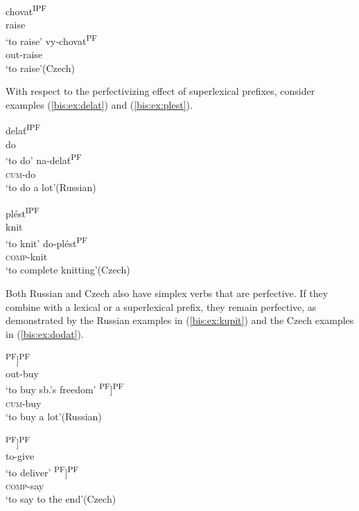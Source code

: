 \documentclass[output=paper]{langscibook}
\begin{document}
\ex\label{bis:ex:chovat}
\ea\label{bis:ex:chovatA} \gll chovat\textsuperscript{IPF} \\ 
raise \\
\glt ‘to raise’
\ex\label{bis:ex:vychovatB} \gll vy-chovat\textsuperscript{PF} \\ 
out-raise \\
\glt ‘to raise’\hfill (Czech)
\z\z

\noindent With respect to the perfectivizing effect of superlexical prefixes, consider examples (\ref{bis:ex:delat}) and (\ref{bis:ex:plest}).

\ea\label{bis:ex:delat}
\ea\label{bis:ex:delatA} \gll delať\textsuperscript{IPF} \\ 
do \\
\glt ‘to do’
\ex\label{bis:ex:nadelatB} \gll na-delať\textsuperscript{PF} \\  
\textsc{cum}-do \\
\glt ‘to do a lot’\hfill (Russian)
\z

\ex\label{bis:ex:plest}
\ea\label{bis:ex:plestA} \gll plést\textsuperscript{IPF} \\ 
knit \\
\glt ‘to knit’
\ex\label{bis:ex:doplestB} \gll do-plést\textsuperscript{PF} \\  
\textsc{comp}-knit \\
\glt ‘to complete knitting’\hfill (Czech)
\z\z

\noindent Both Russian and Czech also have simplex verbs that are perfective. If they combine with a lexical or a superlexical prefix, they remain perfective, as demonstrated by the Russian examples in (\ref{bis:ex:kupit}) and the Czech examples in (\ref{bis:ex:dodat}).

\ea\label{bis:ex:kupit}
\ea\label{bis:ex:vykupitA} \gll [vy-[kupiť]\textsuperscript{PF}]\textsuperscript{PF} \\ 
out-buy \\
\glt ‘to buy sb.’s freedom’
\ex\label{bis:ex:nakupitB} \gll [na-[kupiť]\textsuperscript{PF}]\textsuperscript{PF} \\  
\textsc{cum}-buy \\
\glt ‘to buy a lot’\hfill (Russian)
\z

\ex\label{bis:ex:dodat}
\ea\label{bis:ex:dodatA} \gll [do-[dat]\textsuperscript{PF}]\textsuperscript{PF} \\
to-give \\
\glt ‘to deliver’
\ex\label{bis:ex:doriciB} \gll [do-[říci]\textsuperscript{PF}]\textsuperscript{PF} \\  
\textsc{comp}-say \\
\glt ‘to say to the end’\hfill (Czech)
\z\z
\end{document}
